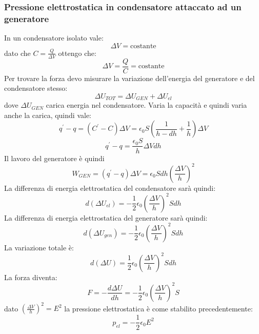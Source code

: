 \documentclass[class=book, crop=false, oneside, 12pt]{standalone}
\begin{document}
\subsubsection*{Pressione elettrostatica in condensatore attaccato ad un generatore}

In un condensatore isolato vale:
\begin{equation*}
    \Delta V = \text{costante}
\end{equation*}
dato che \(C = \frac{Q}{\Delta V}\) ottengo che:
\begin{equation*}
    \Delta V = \frac{Q}{C} = \text{costante}
\end{equation*} 
Per trovare la forza devo misurare la variazione dell'energia del generatore e del condensatore stesso:
\begin{equation*}
    \Delta U_{TOT} = \Delta U_{GEN} + \Delta U_{el}
\end{equation*}
dove \(\Delta U_{GEN}\) carica energia nel condensatore.\newline 
Varia la capacità e quindi varia anche la carica, quindi vale:
\begin{equation*}
    q^{\prime} - q  = \left(C^{\prime }- C\right) \Delta V = \epsilon_0 S \left(\frac{1}{h-dh} + \frac{1}{h}\right) \Delta V
\end{equation*}
\begin{equation*}
    q^{\prime} - q  = \frac {\epsilon_0 S}{h} \Delta V dh 
\end{equation*}
Il lavoro del generatore è quindi
\begin{equation*}
    W_{GEN} = \left(q^{\prime} - q\right) \Delta V = \epsilon_0 S dh \left(\frac{\Delta V }{h}\right)^2 
\end{equation*}
La differenza di energia elettrostatica del condensatore sarà quindi:
\begin{equation*}
    d \left(\Delta U_{el}\right) = - \frac{1}{2} \epsilon_0 \left(\frac{\Delta V}{h}\right)^2 S dh 
\end{equation*}
La differenza di energia elettrostatica del generatore sarà quindi:
\begin{equation*}
    d \left(\Delta U_{gen}\right) = - \frac{1}{2} \epsilon_0 \left(\frac{\Delta V}{h}\right)^2 S dh 
\end{equation*}
La variazione totale è:
\begin{equation*}
    d \left(\Delta U\right) = \frac{1}{2} \epsilon_0 \left(\frac{\Delta V}{h}\right)^2 S dh 
\end{equation*}
La forza diventa:
\begin{equation*}
    F = - \frac{d \Delta U }{dh} =  - \frac{1}{2} \epsilon_0 \left(\frac{\Delta V}{h}\right)^2 S
\end{equation*}
dato \(\left(\frac{\Delta V}{h}\right)^2 = E^2\) la pressione elettrostatica è come stabilito precedentemente:
\begin{equation*}
    p_{el} = - \frac{1}{2} \epsilon_0 E^2
\end{equation*}
\end{document}
